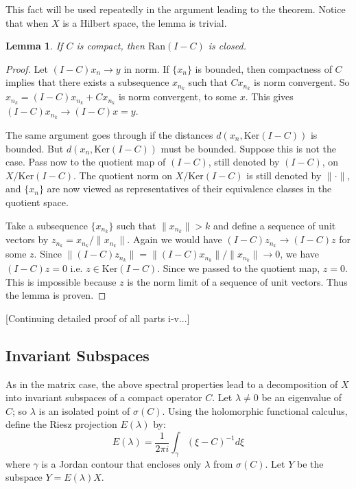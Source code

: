 \documentclass{article}
\newtheorem{lemma}[theorem]{Lemma}
\theoremstyle{definition}
\begin{document}
This fact will be used repeatedly in the argument leading to the theorem. Notice that when $X$ is a Hilbert space, the lemma is trivial.

\begin{lemma}
If $C$ is compact, then $\text{Ran}(I - C)$ is closed.
\end{lemma}

\begin{proof}
Let $(I - C)x_n \to y$ in norm. If $\{x_n\}$ is bounded, then compactness of $C$ implies that there exists a subsequence $x_{n_k}$ such that $Cx_{n_k}$ is norm convergent. So $x_{n_k} = (I - C)x_{n_k} + Cx_{n_k}$ is norm convergent, to some $x$. This gives $(I - C)x_{n_k} \to (I - C)x = y$.

The same argument goes through if the distances $d(x_n, \text{Ker}(I - C))$ is bounded. But $d(x_n, \text{Ker}(I - C))$ must be bounded. Suppose this is not the case. Pass now to the quotient map of $(I - C)$, still denoted by $(I - C)$, on $X/\text{Ker}(I - C)$. The quotient norm on $X/\text{Ker}(I - C)$ is still denoted by $\|\cdot\|$, and $\{x_n\}$ are now viewed as representatives of their equivalence classes in the quotient space.

Take a subsequence $\{x_{n_k}\}$ such that $\|x_{n_k}\| > k$ and define a sequence of unit vectors by $z_{n_k} = x_{n_k}/\|x_{n_k}\|$. Again we would have $(I - C)z_{n_k} \to (I - C)z$ for some $z$. Since $\|(I - C)z_{n_k}\| = \|(I - C)x_{n_k}\|/\|x_{n_k}\| \to 0$, we have $(I - C)z = 0$ i.e. $z \in \text{Ker}(I - C)$. Since we passed to the quotient map, $z = 0$. This is impossible because $z$ is the norm limit of a sequence of unit vectors. Thus the lemma is proven.
\end{proof}

[Continuing detailed proof of all parts i-v...]

\subsection{Invariant Subspaces}
As in the matrix case, the above spectral properties lead to a decomposition of $X$ into invariant subspaces of a compact operator $C$. Let $\lambda \neq 0$ be an eigenvalue of $C$; so $\lambda$ is an isolated point of $\sigma(C)$. Using the holomorphic functional calculus, define the Riesz projection $E(\lambda)$ by:
\[E(\lambda) = \frac{1}{2\pi i}\int_{\gamma} (\xi - C)^{-1} d\xi\]
where $\gamma$ is a Jordan contour that encloses only $\lambda$ from $\sigma(C)$. Let $Y$ be the subspace $Y = E(\lambda)X$.
\end{document}

